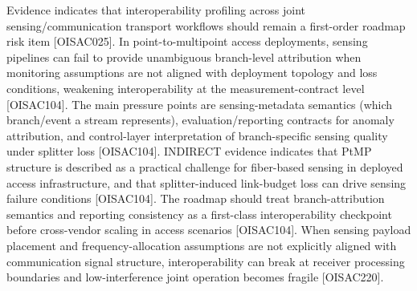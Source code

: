 {} Evidence indicates that interoperability profiling across joint sensing/communication transport workflows should remain a first-order roadmap risk item [O\markdownRendererUnderscore{}ISAC\markdownRendererUnderscore{}025].\markdownRendererInterblockSeparator
{}
\markdownRendererSectionEnd \markdownRendererSectionBegin
{}\markdownRendererInterblockSeparator
{} In point-to-multipoint access deployments, sensing pipelines can fail to provide unambiguous branch-level attribution when monitoring assumptions are not aligned with deployment topology and loss conditions, weakening interoperability at the measurement-contract level [O\markdownRendererUnderscore{}ISAC\markdownRendererUnderscore{}104].\markdownRendererParagraphSeparator
{} The main pressure points are sensing-metadata semantics (which branch/event a stream represents), evaluation/reporting contracts for anomaly attribution, and control-layer interpretation of branch-specific sensing quality under splitter loss [O\markdownRendererUnderscore{}ISAC\markdownRendererUnderscore{}104].\markdownRendererParagraphSeparator
{} INDIRECT evidence indicates that PtMP structure is described as a practical challenge for fiber-based sensing in deployed access infrastructure, and that splitter-induced link-budget loss can drive sensing failure conditions [O\markdownRendererUnderscore{}ISAC\markdownRendererUnderscore{}104].\markdownRendererParagraphSeparator
{} The roadmap should treat branch-attribution semantics and reporting consistency as a first-class interoperability checkpoint before cross-vendor scaling in access scenarios [O\markdownRendererUnderscore{}ISAC\markdownRendererUnderscore{}104].\markdownRendererInterblockSeparator
{}
\markdownRendererSectionEnd \markdownRendererSectionBegin
{}\markdownRendererInterblockSeparator
{} When sensing payload placement and frequency-allocation assumptions are not explicitly aligned with communication signal structure, interoperability can break at receiver processing boundaries and low-interference joint operation becomes fragile [O\markdownRendererUnderscore{}ISAC\markdownRendererUnderscore{}220].\markdownRendererParagraphSeparator
